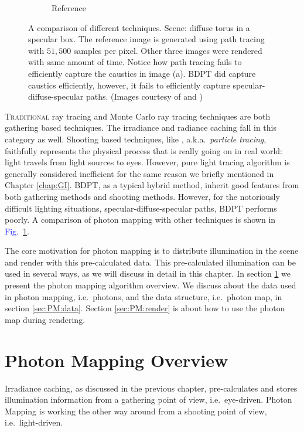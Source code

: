 \documentclass[]{book}
\renewcommand{\figurename}{\textcolor{blue}{Fig.\ }}
\begin{document}
\begin{figure}[!ht]
\begin{subfigure}{0.24\textwidth}
		\caption{Reference}
	\end{subfigure}
	\caption[Photon Mapping Comparison]{A comparison of different techniques. Scene: diffuse torus in a specular box. The reference image is generated using path tracing with $51,500$ samples per pixel. Other three images were rendered with same amount of time. Notice how path tracing fails to efficiently capture the caustics in image (a). BDPT did capture caustics efficiently, however, it fails to efficiently capture specular-diffuse-specular paths. (Images courtesy of \citeauthor{jensen1996global} and \citeauthor{hachisuka2008progressive})}
	\label{fig:PM:compare}
\end{figure}

\lettrine{T}{raditional} ray tracing and Monte Carlo ray tracing techniques are both gathering based techniques.
The irradiance and radiance caching fall in this category as well.
Shooting based techniques, like  \cite{dutre1993lighttrace}, a.k.a.\ \textit{particle tracing}, faithfully represents the physical process that is really going on in real world: light travels from light sources to eyes.
However, pure light tracing algorithm is generally considered inefficient for the same reason we briefly mentioned in Chapter \ref{chap:GI}.
BDPT, as a typical hybrid method, inherit good features from both gathering methods and shooting methods.
However, for the notoriously difficult lighting situations, specular-diffuse-specular paths, BDPT performs poorly.
A comparison of photon mapping with other techniques is shown in \figurename \ref{fig:PM:compare}.

The core motivation for photon mapping is to distribute illumination in the scene and render with this pre-calculated data.
This pre-calculated illumination can be used in several ways, as we will discuss in detail in this chapter.
In section \ref{sec:PM:overview} we present the photon mapping algorithm overview.
We discuss about the data used in photon mapping, i.e.\ photons, and the data structure, i.e.\ photon map, in section \ref{sec:PM:data}.
Section \ref{sec:PM:render} is about how to use the photon map during rendering.

\section{Photon Mapping Overview}
\label{sec:PM:overview}
Irradiance caching, as discussed in the previous chapter, pre-calculates and stores illumination information from a gathering point of view, i.e.\ eye-driven.
Photon Mapping is working the other way around from a shooting point of view, i.e.\ light-driven.
\end{document}
